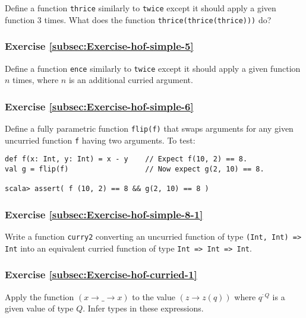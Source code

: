 Define a function \lstinline!thrice! similarly to \lstinline!twice!
except it should apply a given function $3$ times. What does the
function \lstinline!thrice(thrice(thrice)))! do?

\subsubsection{Exercise \label{subsec:Exercise-hof-simple-5}\ref{subsec:Exercise-hof-simple-5}}

Define a function \lstinline!ence! similarly to \lstinline!twice!
except it should apply a given function $n$ times, where $n$ is
an additional curried argument.

\subsubsection{Exercise \label{subsec:Exercise-hof-simple-6}\ref{subsec:Exercise-hof-simple-6}}

Define a fully parametric function \lstinline!flip(f)! that swaps
arguments for any given uncurried function \lstinline!f! having two
arguments. To test: 

\begin{lstlisting}
def f(x: Int, y: Int) = x - y    // Expect f(10, 2) == 8.
val g = flip(f)                  // Now expect g(2, 10) == 8.

scala> assert( f (10, 2) == 8 && g(2, 10) == 8 )
\end{lstlisting}


\subsubsection{Exercise \label{subsec:Exercise-hof-simple-8-1}\ref{subsec:Exercise-hof-simple-8-1}}

Write a function \lstinline!curry2! converting an uncurried function
of type \texttt{}\lstinline!(Int, Int) => Int! into an equivalent
curried function of type \texttt{}\lstinline!Int => Int => Int!.

\subsubsection{Exercise \label{subsec:Exercise-hof-curried-1}\ref{subsec:Exercise-hof-curried-1}}

Apply the function $\left(x\rightarrow\_\rightarrow x\right)$ to
the value $\left(z\rightarrow z(q)\right)$ where $q^{:Q}$ is a given
value of type $Q$. Infer types in these expressions.

